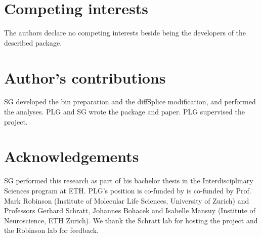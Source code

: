 \documentclass{bmcart}
\begin{document}

\begin{backmatter}

\section*{Competing interests}
  The authors declare no competing interests beside being the developers of the described package.

\section*{Author's contributions}
  SG developed the bin preparation and the diffSplice modification, and performed the analyses. PLG and SG wrote the package and paper. PLG supervised the project.

\section*{Acknowledgements}
  SG performed this research as part of his bachelor thesis in the Interdisciplinary Sciences program at ETH. PLG's position is co-funded by is co-funded by Prof. Mark Robinson (Institute of Molecular Life Sciences, University of Zurich) and Professors Gerhard Schratt, Johannes Bohacek and Isabelle Mansuy (Institute of Neuroscience, ETH Zurich). We thank the Schratt lab for hosting the project and the Robinson lab for feedback.



\end{backmatter}
\end{document}
